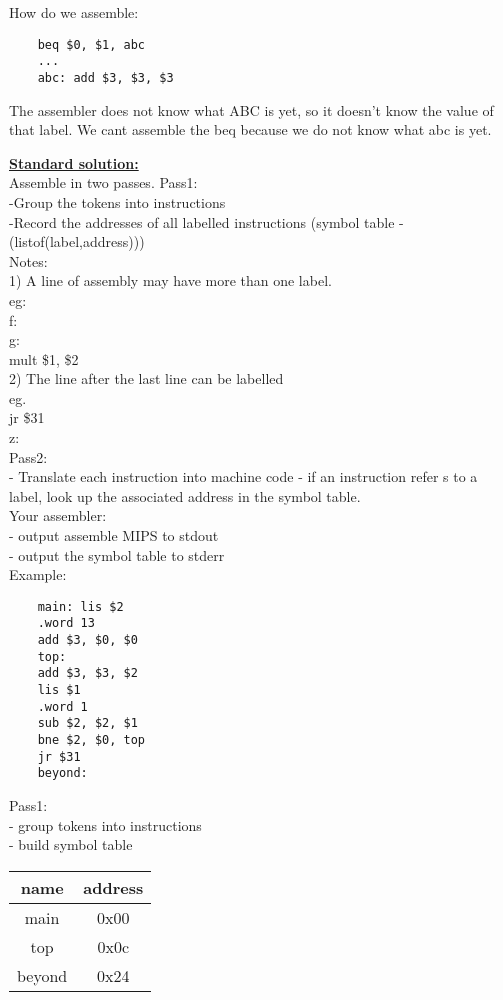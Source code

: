 \documentclass[12pt]{article}
\newcommand{\myt}[1]{\textbf{\underline{#1}}}
\begin{document}
	How do we assemble:
	\lstset{language=[mips]Assembler}
	\begin{lstlisting}
	beq $0, $1, abc
	...
	abc: add $3, $3, $3
	\end{lstlisting}
	The assembler does not know what ABC is yet, so it doesn't know the value of that label. We cant assemble the beq because we do not know what abc is yet.
	
	\myt{Standard solution:}\\
	Assemble in two passes.
	Pass1:\\
	-Group the tokens into instructions\\
	-Record the addresses of all labelled instructions (symbol table - (listof(label,address)))\\
	
	Notes:\\
	1) A line of assembly may have more than one label.\\
	eg:\\
	f:\\
	g:\\
	mult \$1, \$2\\
	2) The line after the last line can be labelled\\
	eg.\\
	jr \$31\\
	z:\\
	
	Pass2:\\
	- Translate each instruction into machine code
	- if an instruction refer
	s to a label, look up the associated address in the symbol table.\\
	
	Your assembler:\\
	- output assemble MIPS to stdout\\
	- output the symbol table to stderr\\
	
	Example:\\
	\begin{lstlisting}
	main: lis $2
	.word 13
	add $3, $0, $0
	top:
	add $3, $3, $2
	lis $1
	.word 1
	sub $2, $2, $1
	bne $2, $0, top
	jr $31
	beyond:
	\end{lstlisting}
	
	Pass1:\\
	- group tokens into instructions\\
	- build symbol table\\
	\begin{tabular}{c | c}
		name & address \\ \hline
		main & 0x00 \\
		top & 0x0c \\
		beyond & 0x24
	\end{tabular}
	
\end{document}
